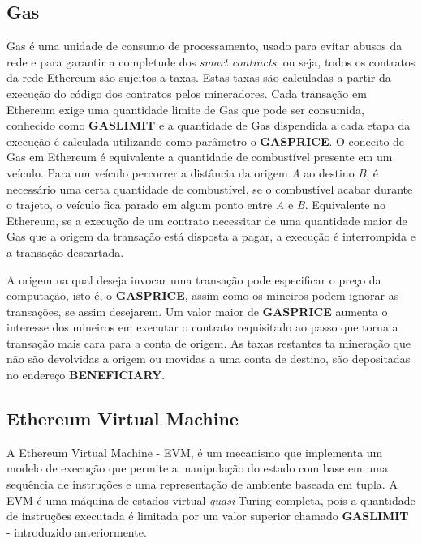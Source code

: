 \documentclass[tcc,capa]{texufpel}
\begin{document}

	\subsection{Gas}
	
	Gas é uma unidade de consumo de processamento, usado para evitar abusos da rede e para garantir a completude dos \textit{smart contracts}, ou seja, todos os contratos da rede Ethereum são sujeitos a taxas. Estas taxas são calculadas a partir da execução do código dos contratos pelos mineradores. Cada transação em Ethereum exige uma quantidade limite de Gas que pode ser consumida, conhecido como \textbf{GASLIMIT} e a quantidade de Gas dispendida a cada etapa da execução é calculada utilizando como parâmetro o \textbf{GASPRICE}. O conceito de Gas em Ethereum é equivalente a quantidade de combustível presente em um veículo. Para um veículo percorrer a distância da origem \textit{A} ao destino \textit{B}, é necessário uma certa quantidade de combustível, se o combustível acabar durante o trajeto, o veículo fica parado em algum ponto entre \textit{A} e  \textit{B}. Equivalente no Ethereum, se a execução de um contrato necessitar de uma quantidade maior de Gas que a origem da transação está disposta a pagar, a execução é interrompida e a transação descartada.
	
	A origem na qual deseja invocar uma transação pode especificar o preço da computação, isto é, o \textbf{GASPRICE}, assim como os mineiros podem ignorar as transações, se assim desejarem. Um valor maior de \textbf{GASPRICE} aumenta o interesse dos mineiros em executar o contrato requisitado ao passo que torna a transação mais cara para a conta de origem. As taxas restantes ta mineração que não são devolvidas a origem ou movidas a uma conta de destino, são depositadas no endereço \textbf{BENEFICIARY}.

    
	\subsection{Ethereum Virtual Machine}
	
	A Ethereum Virtual Machine - EVM, é um mecanismo que implementa um modelo de execução que permite a manipulação do estado com base em uma sequência de instruções e uma representação de ambiente baseada em tupla. A EVM é uma máquina de estados virtual \textit{quasi}-Turing completa, pois a quantidade de instruções executada é limitada por um valor superior chamado \textbf{GASLIMIT} - introduzido anteriormente.
	
\end{document}
